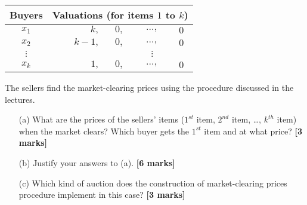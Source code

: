 \documentclass{article}
\begin{document}
\begin{enumerate}
	      \vspace*{0.5cm}
	      \begin{tabular}{c r c c c}
		      Buyers   & \multicolumn{4}{c}{Valuations (for items $1$ to $k$)}                          \\
		      \hline
		      $x_1$    & $k,$                                                  & $0,$ & $\ldots,$ & $0$ \\
		      $x_2$    & $k-1,$                                                & $0,$ & $\ldots,$ & $0$ \\
		      $\vdots$ &                                                       &      & $\vdots$        \\
		      $x_k$    & $1,$                                                  & $0,$ & $\ldots,$ & $0$ \\
	      \end{tabular}

	      \noindent The sellers find the market-clearing prices using the procedure discussed in the lectures.
	      \begin{enumerate}
		      \item[(a)] What are the prices of the sellers' items ($1^{st}$ item, $2^{nd}$ item, \ldots, $k^{th}$ item) when the market clears? Which buyer gets the $1^{st}$ item and at what price?  \hfill{\bf [3 marks]}\smallskip
		      \item[(b)] Justify your answers to (a).  \hfill{\bf [6 marks]}\smallskip
		      \item[(c)] Which kind of auction does the construction of market-clearing prices procedure implement in this case?  \hfill{\bf [3 marks]}\smallskip
	      \end{enumerate}

\end{enumerate}
\end{document}
